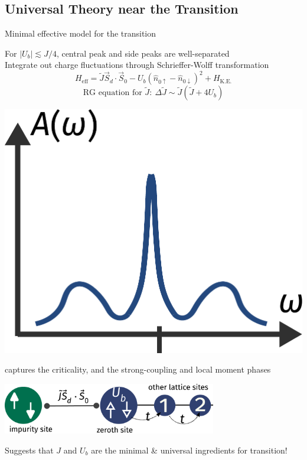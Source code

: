 \documentclass[8pt,aspectratio=169]{beamer}
\begin{document}
\begin{frame}{}
\section{Universal Theory near the Transition}
\end{frame}
\begin{frame}{Minimal effective model for the transition}
\centering
\begin{minipage}{0.65\textwidth}
\begin{itemize}
	\nitem For \(|U_b| \lesssim J/4\), central peak and side peaks are \alert{well-separated} \\[10pt]
	\nitem \alert{Integrate out} charge fluctuations through Schrieffer-Wolff transformation
\[H_\text{eff} = \tilde J \vec{S}_d\cdot\vec{S}_0 - U_b\left(\hat n_{0 \uparrow} - \hat n_{0 \downarrow}\right)^2 + H_\text{K.E.}\]
\[ \text{RG equation for } \tilde J: ~ \Delta \tilde J \sim \tilde J \left( \tilde J  + 4U_b \right) \]
\end{itemize}
\end{minipage}
\hspace*{\fill}
\begin{minipage}{0.3\textwidth}
\includegraphics[width=\textwidth]{sf-2.pdf}
\end{minipage}

\begin{itemize}
\nitem \alert{captures} the criticality, and the strong-coupling and local moment phases
\end{itemize}

\includegraphics[width=0.7\textwidth]{universal-theory.pdf}

\vspace*{\fill}

Suggests that \alert{$J$ and $U_b$ are the minimal \& universal ingredients} for transition!

\end{frame}
\end{document}
